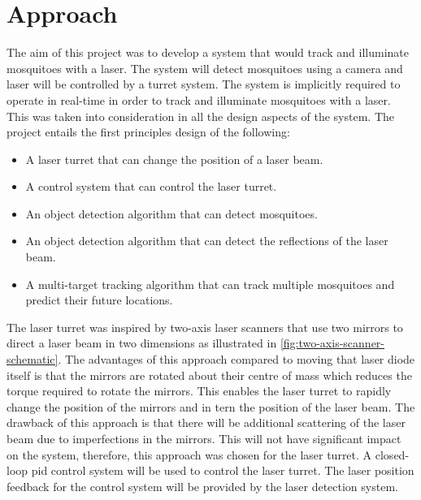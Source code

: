 
\section{Approach}
The aim of this project was to develop a system that would track and  illuminate mosquitoes with a laser. The system will detect mosquitoes using a camera and laser will be controlled by a turret system. The system is implicitly required to operate in real-time in order to track and illuminate mosquitoes with a laser. This was taken into consideration in all the design aspects of the system. The project entails the first principles design of the following:
\begin{itemize}
      \item A laser turret that can change the position of a laser beam.
      \item A control system that can control the laser turret.
      \item An object detection algorithm that can detect mosquitoes.
      \item An object detection algorithm that can detect the reflections of the laser beam.
      \item A multi-target tracking algorithm that can track multiple mosquitoes and predict their future locations.
\end{itemize}

The laser turret was inspired by two-axis laser scanners that use two mirrors to direct a laser beam in two dimensions as illustrated in \autoref{fig:two-axis-scanner-schematic}. The advantages of this approach compared to moving that laser diode itself is that the mirrors are rotated about their centre of mass which reduces the torque required to rotate the mirrors. This enables the laser turret to rapidly change the position of the mirrors and in tern the position of the laser beam. The drawback of this approach is that there will be additional scattering of the laser beam due to imperfections in the mirrors. This will not have significant impact on the system, therefore, this approach was chosen for the laser turret. A closed-loop \gls{pid} control system will be used to control the laser turret. The laser position feedback for the control system will be provided by the laser detection system.


